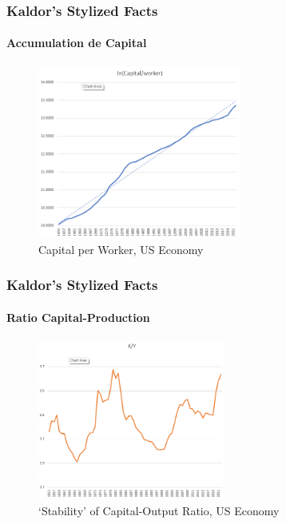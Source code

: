 \documentclass{beamer}
\begin{document}
\begin{frame}
    \frametitle{Kaldor's Stylized Facts}
    \hypertarget{capital}{} %
    \framesubtitle{Accumulation de Capital}
        \begin{figure}
            \centering
            \includegraphics[width=0.6\textwidth]{graphs/lnkperworker_usa.png}
            \caption{Capital per Worker, US Economy
            \hyperlink{kaldor}{}}
        \end{figure}
\end{frame}

\begin{frame}
    \frametitle{Kaldor's Stylized Facts}
    \hypertarget{capital_output_ratio}{} %
    \framesubtitle{Ratio Capital-Production}
        \begin{figure}
            \centering
            \includegraphics[width=0.55\textwidth]{graphs/kyratio_usa.png}
            \caption{\enquote*{Stability} of Capital-Output Ratio, US Economy
            \hyperlink{kaldor}{}}
        \end{figure}
        
\end{frame}
\end{document}
